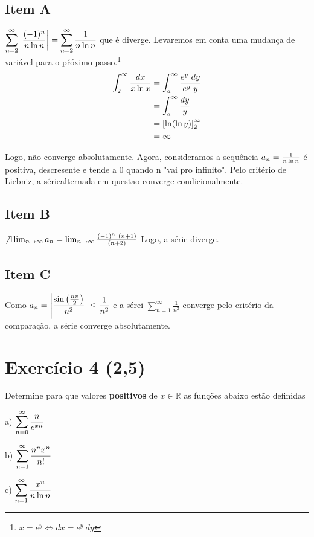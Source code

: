 \documentclass[12pt,openany, letterpaper]{book}
\newcommand{\LI}[1][n]{\lim_{{#1} \rightarrow \infty}}
\newcommand{\soma}[2][n]{\sum_{{#1} = #2}^\infty}
\newcommand{\E}[1]{Exercício #1}
\begin{document}
{{\begin{multicols}{3}
\subsection*{Item A}
$\displaystyle{\soma{2} \left|{(-1)^n \over n \ln{n}}\right| = \soma{2} {1 \over n \ln{n}}}$ que é diverge. Levaremos em conta uma mudança de variável para o pŕóximo passo.\footnote{$x = e^y \Longleftrightarrow dx = e^y \ dy$} \begin{align*}
\int_2^\infty {dx \over x\ln{x}} &= \int_a^\infty {e^y \ dy \over e^y \ y} \\
&= \int_a^\infty {dy \over y} \\
&= \left[\ln({\ln{y}})\right]_2^\infty \\
&= \infty
\end{align*}

Logo, não converge absolutamente. Agora, consideramos a sequência $a_n = {1 \over n\ln{n}}$ é positiva, descresente e tende a 0 quando n "vai pro infinito". Pelo critério de Liebniz, a sériealternada em questao converge condicionalmente.

\subsection*{Item B}
$\not \exists \LI a_n = \LI {(-1)^n \ (n+1) \over (n+2)}$ Logo, a série diverge.

\subsection*{Item C}
Como $\displaystyle{a_n = \left|{\sin\left({n\pi \over 2}\right) \over n^2}\right| \leq {1 \over n^2}}$ e a sérei $\displaystyle{\soma{1} \frac{1}{n^2}}$  converge pelo critério da comparação, a série converge absolutamente.
\end{multicols}

\newpage

\section*{\E{4} (2,5)}{Determine para que valores \textbf{positivos} de $x \in \mathds{R}$ as funções abaixo estão definidas}

\begin{multicols}{4}
a) $\displaystyle{\soma{0} {n \over e^{xn}}}$

b) $\displaystyle{\soma{1} {n^n x^n \over n!}}$

c) $\displaystyle{\soma{1} {x^n \over n \ln{n}}}$


\end{multicols}}}
\end{document}
